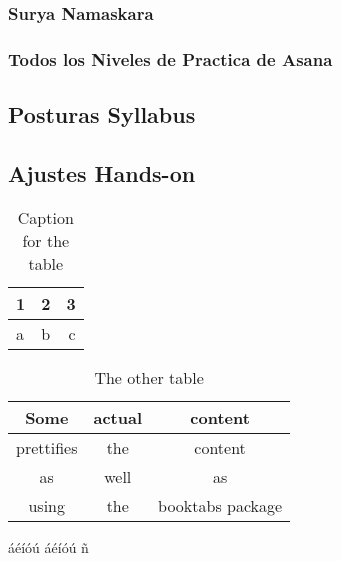 \documentclass[a4paper]{article}
\begin{document}
\subsubsection{Surya Namaskara}
\subsubsection{Todos los Niveles de Practica de Asana}
\subsection{Posturas Syllabus}
\subsection{Ajustes Hands-on}



\begin{table}[h!]
	\centering
	\begin{tabular}{l|c||r}
		1 & 2 & 3\\
		\hline
		a & b & c\\
	\end{tabular}
	\caption{Caption for the table}
	\label{tab:table}
\end{table}


\begin{table}[h!]
	\centering
	\begin{tabular}{ccc}
		\toprule
		Some & actual & content\\
		\midrule
		prettifies & the & content\\
		as & well & as \\
		using & the & booktabs package\\
		\bottomrule
	\end{tabular}
	\caption{The other table}
	\label{tab:table2}
\end{table}


\newpage
áéíóú
\'a\'e\'i\'o\'u
ñ
\end{document}

